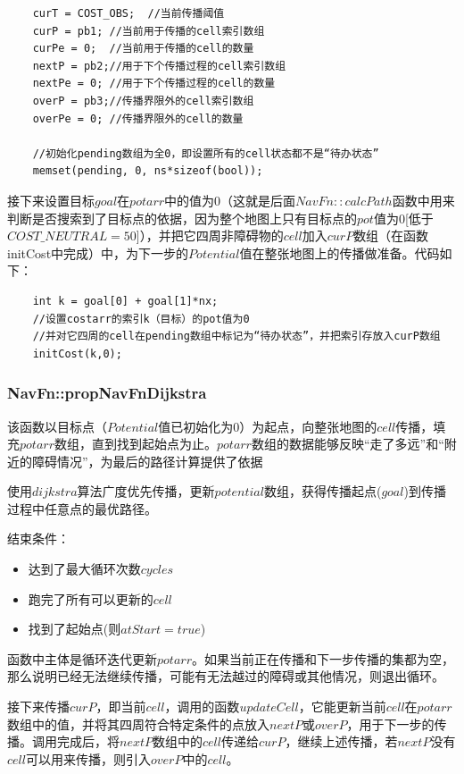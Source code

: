\documentclass[9pt, oneside]{book}
\begin{document}
\begin{verbatim}
    curT = COST_OBS;  //当前传播阈值
    curP = pb1; //当前用于传播的cell索引数组
    curPe = 0;  //当前用于传播的cell的数量
    nextP = pb2;//用于下个传播过程的cell索引数组
    nextPe = 0; //用于下个传播过程的cell的数量
    overP = pb3;//传播界限外的cell索引数组
    overPe = 0; //传播界限外的cell的数量

    //初始化pending数组为全0，即设置所有的cell状态都不是“待办状态”
    memset(pending, 0, ns*sizeof(bool));   
\end{verbatim}

接下来设置目标$goal$在$potarr$中的值为0（这就是后面$NavFn::calcPath$函数中用来判断是否搜索到了目标点的依据，因为整个地图上只有目标点的$pot$值为0[低于$COST\_NEUTRAL=50$]），并把它四周非障碍物的$cell$加入$curP$数组（在函数initCost中完成）中，为下一步的$Potential$值在整张地图上的传播做准备。代码如下：

\begin{verbatim}
    int k = goal[0] + goal[1]*nx;
    //设置costarr的索引k（目标）的pot值为0
    //并对它四周的cell在pending数组中标记为“待办状态”，并把索引存放入curP数组
    initCost(k,0);
\end{verbatim}

\subsubsection{NavFn::propNavFnDijkstra}

该函数以目标点（$Potential$值已初始化为0）为起点，向整张地图的$cell$传播，填充$potarr$数组，直到找到起始点为止。$potarr$数组的数据能够反映“走了多远”和“附近的障碍情况”，为最后的路径计算提供了依据

使用$dijkstra$算法广度优先传播，更新$potential$数组，获得传播起点($goal$)到传播过程中任意点的最优路径。

结束条件：

\begin{itemize}
    \item 达到了最大循环次数$cycles$
    \item 跑完了所有可以更新的$cell$
    \item 找到了起始点(则$atStart = true$)
\end{itemize}

函数中主体是循环迭代更新$potarr$。如果当前正在传播和下一步传播的集都为空，那么说明已经无法继续传播，可能有无法越过的障碍或其他情况，则退出循环。

接下来传播$curP$，即当前$cell$，调用的函数$updateCell$，它能更新当前$cell$在$potarr$数组中的值，并将其四周符合特定条件的点放入$nextP$或$overP$，用于下一步的传播。调用完成后，将$nextP$数组中的$cell$传递给$curP$，继续上述传播，若$nextP$没有$cell$可以用来传播，则引入$overP$中的$cell$。
\end{document}
